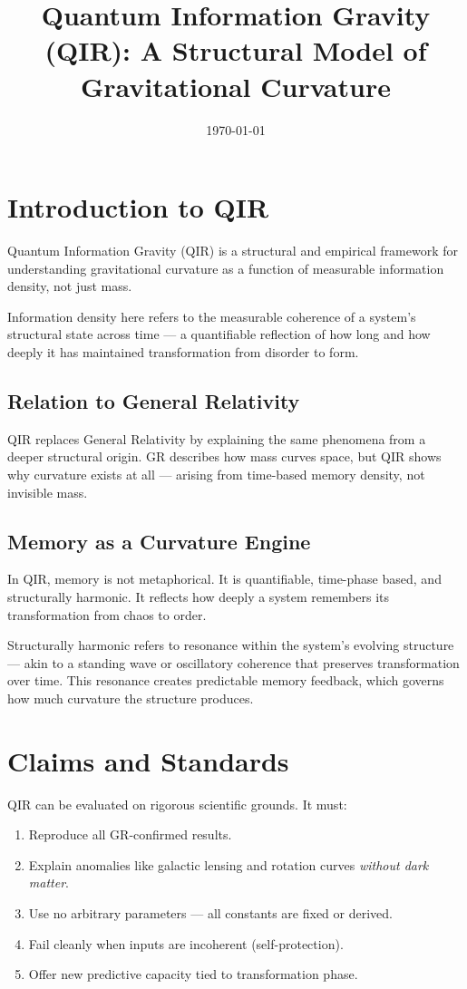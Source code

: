 \documentclass[11pt]{article}
\title{Quantum Information Gravity (QIR): A Structural Model of Gravitational Curvature}
\author{}
\date{\today}
\begin{document}
\maketitle

\tableofcontents
\newpage

\section{Introduction to QIR}
Quantum Information Gravity (QIR) is a structural and empirical framework for understanding gravitational curvature as a function of measurable information density, not just mass.

Information density here refers to the measurable coherence of a system's structural state across time — a quantifiable reflection of how long and how deeply it has maintained transformation from disorder to form.

\subsection{Relation to General Relativity}
QIR replaces General Relativity by explaining the same phenomena from a deeper structural origin. GR describes how mass curves space, but QIR shows why curvature exists at all — arising from time-based memory density, not invisible mass.

\subsection{Memory as a Curvature Engine}
In QIR, memory is not metaphorical. It is quantifiable, time-phase based, and structurally harmonic. It reflects how deeply a system remembers its transformation from chaos to order.

Structurally harmonic refers to resonance within the system's evolving structure — akin to a standing wave or oscillatory coherence that preserves transformation over time. This resonance creates predictable memory feedback, which governs how much curvature the structure produces.

\section{Claims and Standards}
QIR can be evaluated on rigorous scientific grounds. It must:
\begin{enumerate}
  \item Reproduce all GR-confirmed results.
  \item Explain anomalies like galactic lensing and rotation curves \textit{without dark matter}.
  \item Use no arbitrary parameters — all constants are fixed or derived.
  \item Fail cleanly when inputs are incoherent (self-protection).
  \item Offer new predictive capacity tied to transformation phase.
\end{enumerate}
\end{document}
